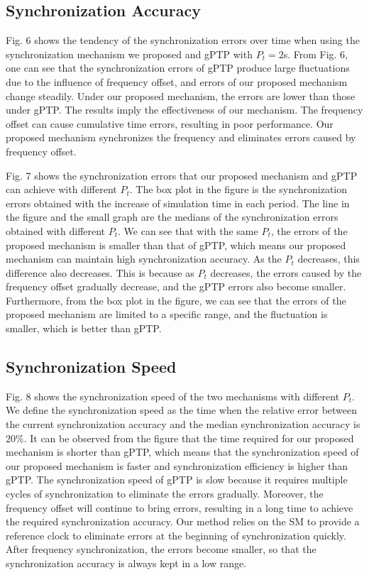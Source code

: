 \documentclass[conference]{IEEEtran}
\begin{document}
	
	
	\subsection{Synchronization Accuracy}
	Fig. 6 shows the tendency of the synchronization errors over time when using the synchronization mechanism we proposed and gPTP with $P_t=2$s. From Fig. 6, one can see that the synchronization errors of gPTP produce large fluctuations due to the influence of frequency offset, and errors of our proposed mechanism change steadily. Under our proposed mechanism, the errors are lower than those under gPTP. The results imply the effectiveness of our mechanism. The frequency offset can cause cumulative time errors, resulting in poor performance. Our proposed mechanism synchronizes the frequency and eliminates errors caused by frequency offset.
	
	
	
	Fig. 7 shows the synchronization errors that our proposed mechanism and gPTP can achieve with different $ P_t $. The box plot in the figure is the synchronization errors obtained with the increase of simulation time in each period. The line in the figure and the small graph are the medians of the synchronization errors obtained with different $ P_t $. We can see that with the same $P_t$, the errors of the proposed mechanism is smaller than that of gPTP, which means our proposed mechanism can maintain high synchronization accuracy. As the $P_t$ decreases, this difference also decreases. This is because as $ P_t $ decreases, the errors caused by the frequency offset gradually decrease, and the gPTP errors also become smaller. Furthermore, from the box plot in the figure, we can see that the errors of the proposed mechanism are limited to a specific range, and the fluctuation is smaller, which is better than gPTP.
	
	
	
	\subsection{Synchronization Speed}
	Fig. 8 shows the synchronization speed of the two mechanisms with different $P_t$. We define the synchronization speed as the time when the relative error between the current synchronization accuracy and the median synchronization accuracy is $20\%$. It can be observed from the figure that the time required for our proposed mechanism is shorter than gPTP, which means that the synchronization speed of our proposed mechanism is faster and synchronization efficiency is higher than gPTP. The synchronization speed of gPTP is slow because it requires multiple cycles of synchronization to eliminate the errors gradually. Moreover, the frequency offset will continue to bring errors, resulting in a long time to achieve the required synchronization accuracy. Our method relies on the SM to provide a reference clock to eliminate errors at the beginning of synchronization quickly. After frequency synchronization, the errors become smaller, so that the synchronization accuracy is always kept in a low range.
	
\end{document}
